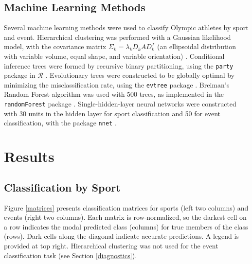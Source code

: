 \documentclass[12pt,letterpaper]{article} %
\begin{document}



\subsection{Machine Learning Methods}


Several machine learning methods were used to classify Olympic athletes by sport and event. Hierarchical clustering was performed with a Gaussian likelihood model, with the covariance matrix $\Sigma_k=\lambda_k D_k A D_k^T$ (an ellipsoidal distribution with variable volume, equal shape, and variable orientation) \citep{heller2005bayesian,fraley2012mclust}. Conditional inference trees were formed by recursive binary partitioning, using the \texttt{party} package in $\mathcal{R}$ \citep{hothorn2006unbiased,hothorn2010party}. Evolutionary trees were constructed to be globally optimal by minimizing the misclassification rate, using the \texttt{evtree} package \citep{grubinger2011evtree}. Breiman's Random Forest algorithm was used with 500 trees, as implemented in the \texttt{randomForest} package \citep{liaw2002classification}. Single-hidden-layer neural networks were constructed with 30 units in the hidden layer for sport classification and 50 for event classification, with the package \texttt{nnet} \citep{venables2002modern}.



\section{Results}

\subsection{Classification by Sport}

Figure \ref{matrices} presents classification matrices for sports (left two columns) and events (right two columns). Each matrix is row-normalized, so the darkest cell on a row indicates the modal predicted class (columns) for true members of the class (rows). Dark cells along the diagonal indicate accurate predictions. A legend is provided at top right. Hierarchical clustering was not used for the event classification task (see Section \ref{diagnostics}).
\end{document}

